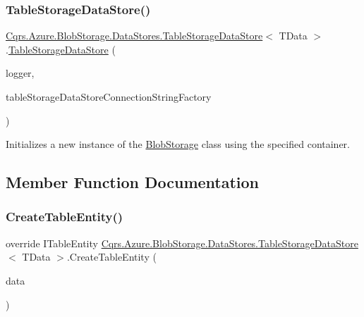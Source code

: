 \subsubsection{\texorpdfstring{Table\+Storage\+Data\+Store()}{TableStorageDataStore()}}
{\footnotesize\ttfamily \hyperlink{classCqrs_1_1Azure_1_1BlobStorage_1_1DataStores_1_1TableStorageDataStore}{Cqrs.\+Azure.\+Blob\+Storage.\+Data\+Stores.\+Table\+Storage\+Data\+Store}$<$ T\+Data $>$.\hyperlink{classCqrs_1_1Azure_1_1BlobStorage_1_1DataStores_1_1TableStorageDataStore}{Table\+Storage\+Data\+Store} (\begin{DoxyParamCaption}\item[{I\+Logger}]{logger,  }\item[{\hyperlink{interfaceCqrs_1_1Azure_1_1BlobStorage_1_1DataStores_1_1ITableStorageDataStoreConnectionStringFactory}{I\+Table\+Storage\+Data\+Store\+Connection\+String\+Factory}}]{table\+Storage\+Data\+Store\+Connection\+String\+Factory }\end{DoxyParamCaption})}



Initializes a new instance of the \hyperlink{namespaceCqrs_1_1Azure_1_1BlobStorage}{Blob\+Storage} class using the specified container. 



\subsection{Member Function Documentation}
\mbox{\label{classCqrs_1_1Azure_1_1BlobStorage_1_1DataStores_1_1TableStorageDataStore_ac28ce10858480acc61d3a3df4fb3dae4}} 
\subsubsection{\texorpdfstring{Create\+Table\+Entity()}{CreateTableEntity()}}
{\footnotesize\ttfamily override I\+Table\+Entity \hyperlink{classCqrs_1_1Azure_1_1BlobStorage_1_1DataStores_1_1TableStorageDataStore}{Cqrs.\+Azure.\+Blob\+Storage.\+Data\+Stores.\+Table\+Storage\+Data\+Store}$<$ T\+Data $>$.Create\+Table\+Entity (\begin{DoxyParamCaption}\item[{T\+Data}]{data }\end{DoxyParamCaption})\hspace{0.3cm}{\ttfamily [protected]}}


